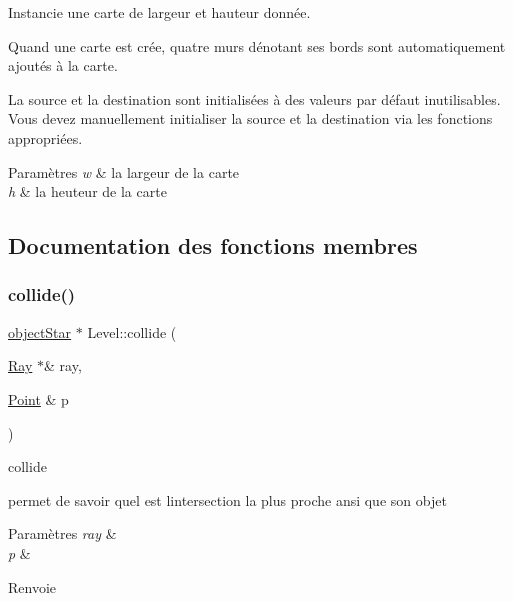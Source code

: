 Instancie une carte de largeur et hauteur donnée. 

Quand une carte est crée, quatre murs dénotant ses bords sont automatiquement ajoutés à la carte. 

La source et la destination sont initialisées à des valeurs par défaut inutilisables. Vous devez manuellement initialiser la source et la destination via les fonctions appropriées. 
\begin{DoxyParams}{Paramètres}
{\em w} & la largeur de la carte \\
\hline
{\em h} & la heuteur de la carte \\
\hline
\end{DoxyParams}


\subsection{Documentation des fonctions membres}
\mbox{\label{class_level_ae5d20d6ebaaa25760a0205505db48c36}} 
\subsubsection{\texorpdfstring{collide()}{collide()}}
{\footnotesize\ttfamily \mbox{\hyperlink{classobject_star}{object\+Star}} $\ast$ Level\+::collide (\begin{DoxyParamCaption}\item[{\mbox{\hyperlink{class_ray}{Ray}} $\ast$\&}]{ray,  }\item[{\mbox{\hyperlink{class_point}{Point}} \&}]{p }\end{DoxyParamCaption})}



collide 

permet de savoir quel est l\textquotesingle{}intersection la plus proche ansi que son objet 
\begin{DoxyParams}{Paramètres}
{\em ray} & \\
\hline
{\em p} & \\
\hline
\end{DoxyParams}
\begin{DoxyReturn}{Renvoie}

\end{DoxyReturn}
\mbox{\label{class_level_ad28d918ed43c60e845b8805cf9b6b139}} 
